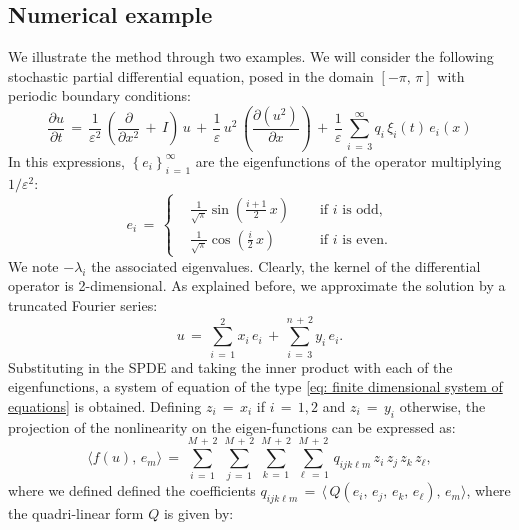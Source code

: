 \subsection{Numerical example}
\label{sub:numerical_example}
We illustrate the method through two examples. 
We will consider the following stochastic partial differential equation, posed in the domain $ [ -{\pi},\,{\pi}]$ with periodic boundary conditions:
\begin{equation}
    \frac{{\partial}u}{{\partial}t} \,=\,\frac{1}{{\varepsilon}^2}\, \left( \frac{\partial}{{\partial}x^2} \,+\,I\right)\,u \,+\, \frac{1}{\varepsilon} \, u^2\,\left(\frac{{\partial}(u^2)}{{\partial}x}\right) \,+\, \frac{1}{\varepsilon} \, \sum_{ i\,=\,3}^{ {\infty}}  q_i\,{\xi}_i(t)\, e_i(x) 
    \label{eq: undefined label}
\end{equation}
In this expressions, $\left\{e_i\right\}_{i\,=\,1}^{\infty}$ are the eigenfunctions of the operator multiplying $1/{\varepsilon}^2$:
\begin{equation*}
    e_i \,=\, \left\{
        \begin{aligned}
            & \frac{1}{\sqrt{\pi}}\sin\left(\frac{i+1}{2}\,x\right) &\quad \text{ if $i$ is odd,} \\
            & \frac{1}{\sqrt {\pi}}\cos\left(\frac{i}{2}\,x\right) &\quad \text{ if $i$ is even.}
        \end{aligned} \right .
\end{equation*}
We note $-{\lambda}_i$ the associated eigenvalues. 
Clearly, the kernel of the differential operator is 2-dimensional.
As explained before, we approximate the solution by a truncated Fourier series:
\begin{equation*}
    u \,=\, \sum_{ i\,=\,1}^{ 2} x_i\,e_i \,+\, \sum_{ i\,=\,3}^{ n\,+\,2} y_i \, e_i.
\end{equation*}
Substituting in the SPDE and taking the inner product with each of the eigenfunctions, a system of equation of the type \eqref{eq: finite dimensional system of equations} is obtained.
Defining $z_i \,=\, x_i$ if $i \,=\,1,2$ and $z_i \,=\,y_i$ otherwise, the projection of the nonlinearity on the eigen-functions can be expressed as:
\begin{equation}
    \langle f(u),\,e_m\rangle \,=\,\sum_{ i\,=\,1}^{ M\,+\,2}\, \sum_{ j\,=\,1}^{ M\,+\,2}\,\sum_{ k\,=\,1}^{ M\,+\,2}\,\sum_{ {\ell}\,=\,1}^{ M\,+\,2}\, q_{ijk{\ell}m} \, z_i\,z_j\,z_k\,z_{\ell}, 
    \label{eq: projection nonlin example 1}
\end{equation}
where we defined defined the coefficients $q_{ijk{\ell}m} \,=\, \langle\, Q(e_i,\,e_j,\,e_k,\,e_{\ell}),\,e_m \rangle$, where the quadri-linear form $Q$ is given by:
